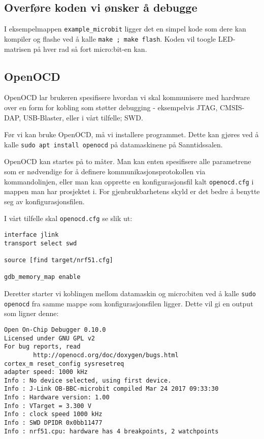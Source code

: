 \subsection{Overføre koden vi ønsker å debugge}
I eksempelmappen \verb|example_microbit| ligger det en simpel kode som dere kan kompiler og flashe ved å kalle \verb|make ; make flash|. Koden vil toogle LED-matrisen på hver rad så fort micro:bit-en kan.

\subsection{OpenOCD}

OpenOCD lar brukeren spesifisere hvordan vi skal kommunisere med hardware over en form for kobling som støtter debugging - eksempelvis JTAG, CMSIS-DAP, USB-Blaster, eller i vårt tilfelle; SWD.

Før vi kan bruke OpenOCD, må vi installere programmet. Dette kan gjøres ved å kalle \verb|sudo apt install openocd| på datamaskinene på Sanntidssalen. 

OpenOCD kan startes på to måter. Man kan enten spesifisere alle parametrene som er nødvendige for å definere kommunikasjonsprotokollen via kommandolinjen, eller man kan opprette en konfigurasjonsfil kalt \verb|openocd.cfg| i mappen man har prosjektet i. For gjenbrukbarhetens skyld er det bedre å benytte seg av konfigurasjonsfilen.

I vårt tilfelle skal \verb|openocd.cfg| se slik ut:

\begin{lstlisting}[mathescape=true]
interface jlink
transport select swd

source [find target/nrf51.cfg]

gdb_memory_map enable
\end{lstlisting}


Deretter starter vi koblingen mellom datamaskin og micro:biten ved å kalle \verb|sudo openocd| fra samme mappe som konfigurasjonsfilen ligger. Dette vil gi en output som ligner denne:

\begin{lstlisting}[mathescape=true]
Open On-Chip Debugger 0.10.0
Licensed under GNU GPL v2
For bug reports, read
        http://openocd.org/doc/doxygen/bugs.html
cortex_m reset_config sysresetreq
adapter speed: 1000 kHz
Info : No device selected, using first device.
Info : J-Link OB-BBC-microbit compiled Mar 24 2017 09:33:30
Info : Hardware version: 1.00
Info : VTarget = 3.300 V
Info : clock speed 1000 kHz
Info : SWD DPIDR 0x0bb11477
Info : nrf51.cpu: hardware has 4 breakpoints, 2 watchpoints
\end{lstlisting}


